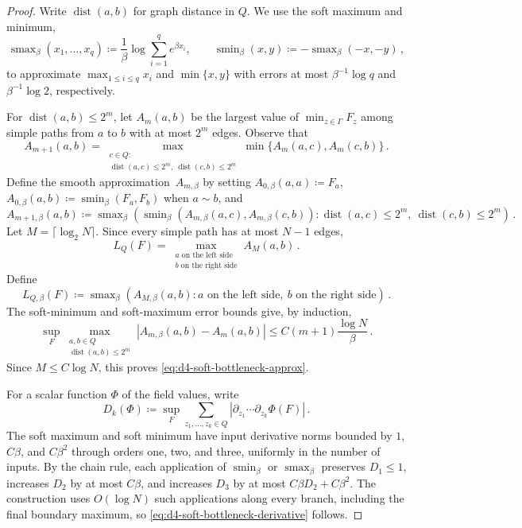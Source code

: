 \documentclass[11pt]{amsart}
\theoremstyle{plain}
\theoremstyle{definition}
\begin{document}
\begin{proof}
	Write $\operatorname{dist}(a,b)$ for graph distance in $Q$. We use the soft maximum and
	minimum, 
	\[
		\operatorname{smax}_\beta(x_1,\ldots,x_q)
		\coloneqq
		\frac1\beta\log\sum_{i=1}^q e^{\beta x_i},
		\qquad
		\operatorname{smin}_\beta(x,y)
		\coloneqq
		-\operatorname{smax}_\beta(-x,-y) \, , 
	\]
	to approximate $\max_{1\leq i\leq q}x_i$ and $\min\{x,y\}$ with errors at
	most $\beta^{-1}\log q$ and $\beta^{-1}\log2$, respectively.

	For $\operatorname{dist}(a,b)\leq2^m$, let $A_m(a,b)$ be the largest value of
	$\min_{z\in\Gamma}F_z$ among simple paths from $a$ to $b$ with at most
	$2^m$ edges. Observe that 
	\[
		A_{m+1}(a,b)=
		\max_{\substack{c\in Q:\\ \operatorname{dist}(a,c)\leq2^m,\ \operatorname{dist}(c,b)\leq2^m}}
		\min\{A_m(a,c),A_m(c,b)\} \, . 
	\]
	Define the smooth approximation~$A_{m,\beta}$ by setting
	$A_{0,\beta}(a,a)\coloneqq F_a$,
	$A_{0,\beta}(a,b)\coloneqq\operatorname{smin}_\beta(F_a,F_b)$ when $a\sim b$, and
	\[
		A_{m+1,\beta}(a,b)\coloneqq
		\operatorname{smax}_\beta\left(
		\operatorname{smin}_\beta(A_{m,\beta}(a,c),A_{m,\beta}(c,b)):
		\operatorname{dist}(a,c)\leq2^m,\ \operatorname{dist}(c,b)\leq2^m\right) \, . 
	\]
	Let $M=\lceil\log_2N\rceil$. Since every simple path has at most $N-1$
	edges,
	\[
		L_Q(F)=
		\max_{\substack{a\text{ on the left side}\\ b\text{ on the right side}}}
		A_M(a,b) \, . 
	\]
	Define
	\[
		L_{Q,\beta}(F)\coloneqq
		\operatorname{smax}_\beta\left(
		A_{M,\beta}(a,b):
		a\text{ on the left side},\ b\text{ on the right side}\right) \, .
	\]
	The soft-minimum and soft-maximum error bounds give, by induction,
	\[
		\sup_F
		\max_{\substack{a,b\in Q\\ \operatorname{dist}(a,b)\leq2^m}}
		|A_{m,\beta}(a,b)-A_m(a,b)|
		\leq C(m+1)\frac{\log N}{\beta}\, .
	\]
	Since $M\leq C\log N$, this proves \eqref{eq:d4-soft-bottleneck-approx}.

	For a scalar function $\Phi$ of the field values, write
	\[
		D_k(\Phi)\coloneqq
		\sup_F
		\sum_{z_1,\ldots,z_k\in Q}
		|\partial_{z_1}\cdots\partial_{z_k}\Phi(F)|\, .
	\]
	The soft maximum and soft minimum have input derivative norms bounded by $1$, $C\beta$, and $C\beta^2$ through orders one, two, and three, uniformly in the number of inputs. By the chain rule, each application of $\operatorname{smin}_\beta$ or $\operatorname{smax}_\beta$ preserves $D_1\leq1$, increases $D_2$ by at most
	$C\beta$, and increases $D_3$ by at most $C\beta D_2+C\beta^2$. The construction uses $O(\log N)$ such applications along every branch, including the final boundary maximum, so \eqref{eq:d4-soft-bottleneck-derivative} follows.
\end{proof}
\end{document}

